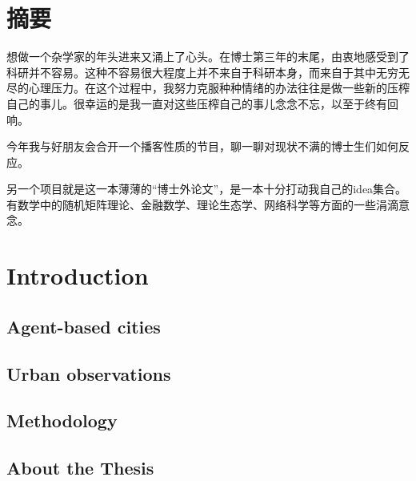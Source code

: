 \chapter*{摘要}

想做一个杂学家的年头进来又涌上了心头。在博士第三年的末尾，由衷地感受到了科研并不容易。这种不容易很大程度上并不来自于科研本身，而来自于其中无穷无尽的心理压力。在这个过程中，我努力克服种种情绪的办法往往是做一些新的压榨自己的事儿。很幸运的是我一直对这些压榨自己的事儿念念不忘，以至于终有回响。

今年我与好朋友会合开一个播客性质的节目，聊一聊对现状不满的博士生们如何反应。

另一个项目就是这一本薄薄的“博士外论文”，是一本十分打动我自己的idea集合。有数学中的随机矩阵理论、金融数学、理论生态学、网络科学等方面的一些涓滴意念。

\chapter{Introduction}


\section{Agent-based cities}




\section{Urban observations}




\section{Methodology}





\section{About the Thesis}